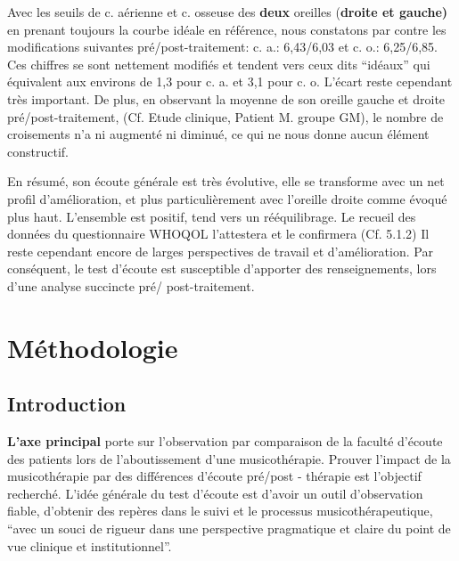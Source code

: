 Avec les
seuils
de c. aérienne et c. osseuse des\textbf{ deux} oreilles (\textbf{droite et gauche)} en prenant toujours 
 la courbe idéale en référence, nous
constatons par contre les modifications suivantes pré/post-traitement:
c. a.: 6,43/6,03 et c. o.: 6,25/6,85.
Ces chiffres se sont nettement
modifiés et tendent vers
ceux dits ``idéaux''  qui équivalent aux environs de 1,3 pour
c. a. et 3,1 pour c. o. L'écart reste cependant très important. %
De plus, en observant la moyenne de son oreille gauche et droite pré/post-traitement, (Cf. Etude 
clinique, Patient M. groupe GM), le
nombre de croisements n'a ni augmenté ni diminué, ce qui ne nous donne
aucun élément constructif.
 
En résumé, son écoute générale est très évolutive, elle se transforme avec un net profil d'amélioration, et 
plus particulièrement avec l'oreille
droite comme évoqué plus haut. L'ensemble est positif, tend vers un
rééquilibrage. Le recueil des données du
questionnaire WHOQOL l'attestera et le confirmera (Cf. 5.1.2)
Il reste cependant encore de larges perspectives de travail et d'amélioration.
Par conséquent, le test d'écoute est susceptible d'apporter des renseignements, lors
d'une analyse succincte pré/ post-traitement.


\chapter{Méthodologie} 

\section{Introduction}
 
\textbf{L'axe principal} porte sur l'observation par comparaison de la faculté d'écoute des 
patients lors de l'aboutissement d'une musicothérapie.
Prouver l'impact de la musicothérapie par des différences d'écoute pré/post - 
thérapie est l'objectif  recherché.
L'idée générale du test d'écoute est d'avoir un outil d'observation fiable, d'obtenir des repères 
dans le suivi et le processus musicothérapeutique, \enquote {avec un souci de rigueur dans une 
	perspective pragmatique et claire du point de vue clinique et institutionnel}\autocite[p. 
36]{vrait_musicotherapie_2018}. 

